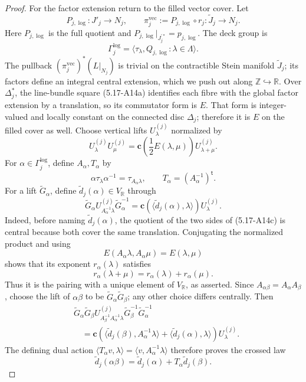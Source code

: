 \begin{proof}
For the factor extension return to the filled vector cover.  Let
\[
 P_{j,\log}:J'_j\longrightarrow N_j,\qquad
 \pi_j^{\mathrm{vec}}:=P_{j,\log}\circ r_j:
 \widetilde J_j\longrightarrow N_j .
\]
Here \(P_{j,\log}\) is the full quotient and
\(P_{j,\log}|_{J_j^{\prime *}}=p_{j,\log}\).
The deck group is
\[
 \Gamma_j^{\log}
 =\langle\tau_\lambda,Q_{j,\log}:\lambda\in\Lambda\rangle.
\]
The pullback \((\pi_j^{\mathrm{vec}})^*(L|_{N_j})\) is trivial on the
contractible Stein manifold \(\widetilde J_j\); its factors define an
integral central extension, which we push out along
\(\mathbb Z\hookrightarrow\mathbb R\).  Over \(\Delta_j^*\), the
line-bundle square (5.17-A14a) identifies each fibre with the global factor
extension by a translation, so its commutator form is \(E\).  That form is
integer-valued and locally constant on the connected disc \(\Delta_j\);
therefore it is \(E\) on the filled cover as well.  Choose vertical lifts
\(U_\lambda^{(j)}\) normalized by
\[
 U_\lambda^{(j)}U_\mu^{(j)}
 =\mathbf c\!\left(\frac12E(\lambda,\mu)\right)
  U_{\lambda+\mu}^{(j)}.
\]
For \(\alpha\in\Gamma_j^{\log}\), define \(A_\alpha,T_\alpha\) by
\[
 \alpha\tau_\lambda\alpha^{-1}=\tau_{A_\alpha\lambda},\qquad
 T_\alpha=(A_\alpha^{-1})^{\mathsf t}.
\]
For a lift \(\widetilde G_\alpha\), define
\(\widetilde d_j(\alpha)\in V_{\mathbb R}\) through
\[
 \widetilde G_\alpha U_{A_\alpha^{-1}\lambda}^{(j)}
 \widetilde G_\alpha^{-1}
 =\mathbf c\!\left(\langle\widetilde d_j(\alpha),\lambda\rangle\right)
  U_\lambda^{(j)}.
\tag{5.17-A14c}
\]
Indeed, before naming \(\widetilde d_j(\alpha)\), the quotient of the two
sides of (5.17-A14c) is central because both cover the same translation.
Conjugating the normalized product and using
\[
 E(A_\alpha\lambda,A_\alpha\mu)=E(\lambda,\mu)
\]
shows that its exponent \(r_\alpha(\lambda)\) satisfies
\[
 r_\alpha(\lambda+\mu)=r_\alpha(\lambda)+r_\alpha(\mu).
\]
Thus it is the pairing with a unique element of \(V_{\mathbb R}\), as
asserted.  Since \(A_{\alpha\beta}=A_\alpha A_\beta\), choose the lift of
\(\alpha\beta\) to be \(\widetilde G_\alpha\widetilde G_\beta\); any other
choice differs centrally.  Then
\[
\begin{aligned}
 &\widetilde G_\alpha\widetilde G_\beta
 U_{A_\beta^{-1}A_\alpha^{-1}\lambda}^{(j)}
 \widetilde G_\beta^{-1}\widetilde G_\alpha^{-1}\\
 &\quad=
 \mathbf c\!\left(
  \langle\widetilde d_j(\beta),A_\alpha^{-1}\lambda\rangle
  +\langle\widetilde d_j(\alpha),\lambda\rangle\right)
 U_\lambda^{(j)}.
\end{aligned}
\]
The defining dual action
\(\langle T_\alpha v,\lambda\rangle
=\langle v,A_\alpha^{-1}\lambda\rangle\) therefore proves the crossed law
\[
 \widetilde d_j(\alpha\beta)
 =\widetilde d_j(\alpha)+T_\alpha\widetilde d_j(\beta).
\tag{5.17-A14d}
\]


\end{proof}

